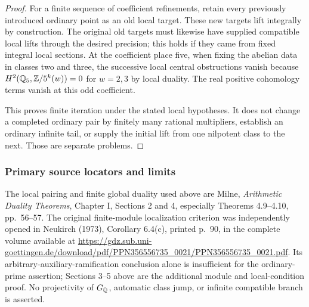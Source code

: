 \begin{proof}
For a finite sequence of coefficient refinements, retain every previously introduced ordinary point as an old local target. These new targets lift integrally by construction. The original old targets must likewise have supplied compatible local lifts through the desired precision; this holds if they came from fixed integral local sections. At the coefficient place five, when fixing the abelian data in classes two and three, the successive local central obstructions vanish because $H^2(\mathbb Q_5,\mathbb Z/5^k(w))=0$ for $w=2,3$ by local duality. The real positive cohomology terms vanish at this odd coefficient.

This proves finite iteration under the stated local hypotheses. It does not change a completed ordinary pair by finitely many rational multipliers, establish an ordinary infinite tail, or supply the initial lift from one nilpotent class to the next. Those are separate problems.
\end{proof}

\subsubsection*{Primary source locators and limits}
The local pairing and finite global duality used above are Milne, \emph{Arithmetic Duality Theorems}, Chapter I, Sections 2 and 4, especially Theorems 4.9--4.10, pp.~56--57. The original finite-module localization criterion was independently opened in Neukirch (1973), Corollary 6.4(c), printed p.~90, in the complete volume available at
\url{https://gdz.sub.uni-goettingen.de/download/pdf/PPN356556735_0021/PPN356556735_0021.pdf}.
Its arbitrary-auxiliary-ramification conclusion alone is insufficient for the ordinary-prime assertion; Sections 3--5 above are the additional module and local-condition proof. No projectivity of $G_\mathbb Q$, automatic class jump, or infinite compatible branch is asserted.
